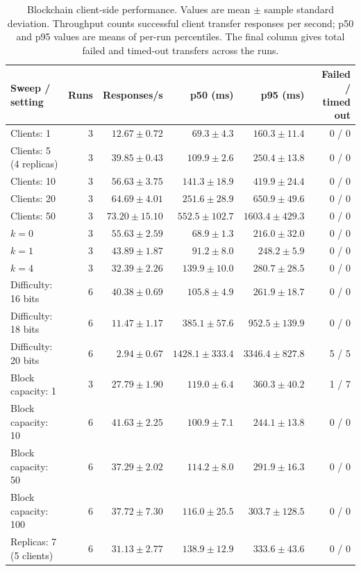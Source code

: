 \documentclass[sigconf,a4paper]{acmart}
\begin{document}
    \begin{table}[t]
        \centering
        \scriptsize
        \caption{Blockchain client-side performance. Values are mean $\pm$
        sample standard deviation. Throughput counts successful client transfer
    responses per second; p50 and p95 values are means of per-run percentiles.
    The final column gives total failed and timed-out transfers across the runs.}
        \label{tab:blockchain-performance}
        \begin{tabular}{l r r r r r}
            \toprule
            \textbf{Sweep / setting} & \textbf{Runs} &
            \textbf{Responses/s} & \textbf{p50 (ms)} & \textbf{p95 (ms)} &
            \textbf{Failed / timed out} \\
            \midrule
            Clients: 1 & 3 & $12.67\pm0.72$ & $69.3\pm4.3$ & $160.3\pm11.4$ & 0 / 0 \\
            Clients: 5 (4 replicas) & 3 & $39.85\pm0.43$ & $109.9\pm2.6$ & $250.4\pm13.8$ & 0 / 0 \\
            Clients: 10 & 3 & $56.63\pm3.75$ & $141.3\pm18.9$ & $419.9\pm24.4$ & 0 / 0 \\
            Clients: 20 & 3 & $64.69\pm4.01$ & $251.6\pm28.9$ & $650.9\pm49.6$ & 0 / 0 \\
            Clients: 50 & 3 & $73.20\pm15.10$ & $552.5\pm102.7$ & $1603.4\pm429.3$ & 0 / 0 \\
            $k=0$ & 3 & $55.63\pm2.59$ & $68.9\pm1.3$ & $216.0\pm32.0$ & 0 / 0 \\
            $k=1$ & 3 & $43.89\pm1.87$ & $91.2\pm8.0$ & $248.2\pm5.9$ & 0 / 0 \\
            $k=4$ & 3 & $32.39\pm2.26$ & $139.9\pm10.0$ & $280.7\pm28.5$ & 0 / 0 \\
            Difficulty: 16 bits & 6 & $40.38\pm0.69$ & $105.8\pm4.9$ & $261.9\pm18.7$ & 0 / 0 \\
            Difficulty: 18 bits & 6 & $11.47\pm1.17$ & $385.1\pm57.6$ & $952.5\pm139.9$ & 0 / 0 \\
            Difficulty: 20 bits & 6 & $2.94\pm0.67$ & $1428.1\pm333.4$ & $3346.4\pm827.8$ & 5 / 5 \\
            Block capacity: 1 & 3 & $27.79\pm1.90$ & $119.0\pm6.4$ & $360.3\pm40.2$ & 1 / 7 \\
            Block capacity: 10 & 6 & $41.63\pm2.25$ & $100.9\pm7.1$ & $244.1\pm13.8$ & 0 / 0 \\
            Block capacity: 50 & 6 & $37.29\pm2.02$ & $114.2\pm8.0$ & $291.9\pm16.3$ & 0 / 0 \\
            Block capacity: 100 & 6 & $37.72\pm7.30$ & $116.0\pm25.5$ & $303.7\pm128.5$ & 0 / 0 \\
            Replicas: 7 (5 clients) & 6 & $31.13\pm2.77$ & $138.9\pm12.9$ & $333.6\pm43.6$ & 0 / 0 \\
            \bottomrule
        \end{tabular}
    \end{table}
\end{document}
